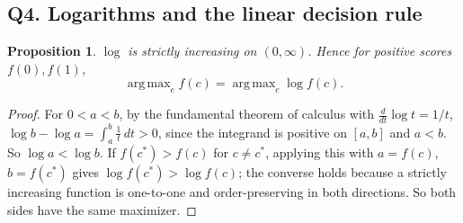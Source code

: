 \documentclass[11pt]{article}
\theoremstyle{plain}
\newtheorem{proposition}[theorem]{Proposition}
\theoremstyle{definition}
\DeclareMathOperator*{\argmax}{arg\,max}
\begin{document}
\subsection{Q4. Logarithms and the linear decision rule}\label{sec:q4}

\begin{proposition}\label{prop:log}
$\log$ is strictly increasing on $(0,\infty)$. Hence for positive scores $f(0),f(1)$,
\[
\argmax_c f(c)=\argmax_c\log f(c).
\]
\end{proposition}
\begin{proof}
For $0<a<b$, by the fundamental theorem of calculus with $\frac{d}{dt}\log t=1/t$,
$\log b-\log a=\int_a^b\frac1t\,dt>0$, since the integrand is positive on $[a,b]$ and $a<b$.
So $\log a<\log b$. If $f(c^*)>f(c)$ for $c\neq c^*$, applying this with $a=f(c)$,
$b=f(c^*)$ gives $\log f(c^*)>\log f(c)$; the converse holds because a strictly increasing
function is one-to-one and order-preserving in both directions. So both sides have the same maximizer.
\end{proof}
\end{document}
